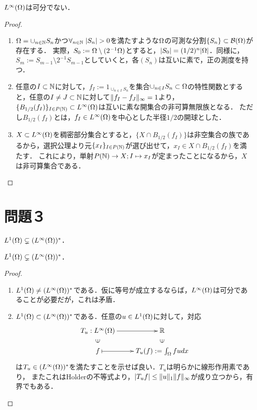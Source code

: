 \documentclass[uplatex,dvipdfmx]{jsarticle}
\begin{document}
\begin{theorem}
    $L^\infty(\Omega)$は可分でない．
\end{theorem}
\begin{proof}\mbox{}
    \begin{enumerate}
        \item $\Omega=\cup_{n\in\mathbb{N}}S_n$かつ$\forall_{n\in\mathbb{N}}\;\lvert S_n\rvert>0$を満たすような$\Omega$の可測な分割$\{S_n\}\subset\mathcal{B}(\Omega)$が存在する．
        実際，$S_0:=\Omega\setminus(2^{-1}\Omega)$とすると，$\lvert S_0\rvert=(1/2)^n\lvert\Omega\rvert$．同様に，$S_m:=S_{m-1}\setminus2^{-1}S_{m-1}$としていくと，各$(S_n)$は互いに素で，正の測度を持つ．
        \item 任意の$I\subset\mathbb{N}$に対して，$f_I:=1_{\cup_{n\in I}S_n}$を集合$\cup_{n\in I}S_n\subset\Omega$の特性関数とすると，任意の$I\ne J\subset\mathbb{N}$に対して$\|f_I-f_J\|_\infty=1$より，$\{B_{1/2}(f_I)\}_{I\in P(\mathbb{N})}\subset L^\infty(\Omega)$は互いに素な開集合の非可算無限族となる．
        ただし$B_{1/2}(f_I)$とは，$f_I\in L^\infty(\Omega)$を中心とした半径$1/2$の開球とした．
        \item $X\subset L^\infty(\Omega)$を稠密部分集合とすると，$\{X\cap B_{1/2}(f_I)\}$は非空集合の族であるから，選択公理より元$\{x_I\}_{I\in P(\mathbb{N})}$が選び出せて，$x_I\in X\cap B_{1/2}(f_I)$を満たす．
        これにより，単射$P(\mathbb{N})\to X;I\mapsto x_I$が定まったことになるから，$X$は非可算集合である．
    \end{enumerate}
\end{proof}

\section{問題３}

\begin{tcolorbox}[colframe=ForestGreen, colback=ForestGreen!10!white,breakable,colbacktitle=ForestGreen!40!white,coltitle=black,fonttitle=\bfseries\sffamily,
title=]
    $L^1(\Omega)\subsetneq (L^\infty(\Omega))^*$．
\end{tcolorbox}

\begin{theorem}
    $L^1(\Omega)\subsetneq (L^\infty(\Omega))^*$．
\end{theorem}
\begin{proof}\mbox{}
    \begin{enumerate}
        \item $L^1(\Omega)\ne (L^\infty(\Omega))^*$である．仮に等号が成立するならば，$L^\infty(\Omega)$は可分であることが必要だが，これは矛盾．
        \item $L^1(\Omega)\subset (L^\infty(\Omega))^*$である．任意の$u\in L^1(\Omega)$に対して，対応
        \[\xymatrix@R-2pc{
            T_u:L^\infty(\Om)\ar[r]&\R\\
            \rotatebox[origin=c]{90}{$\in$}&\rotatebox[origin=c]{90}{$\in$}\\
            f\ar@{|->}[r]&T_u(f):=\int_\Om fudx
        }\]
        は$T_u\in(L^\infty(\Omega))^*$を満たすことを示せば良い．$T_u$は明らかに線形作用素であり，
        またこれはHolderの不等式より，$\lvert T_uf\rvert\le\|u\|_1\|f\|_\infty$が成り立つから，有界でもある．
    \end{enumerate}
\end{proof}
\end{document}
